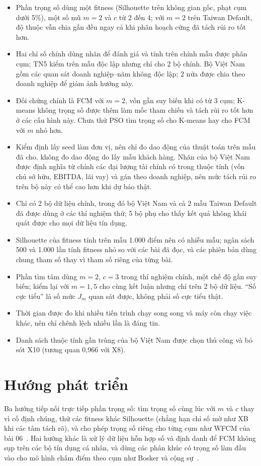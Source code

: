 \begin{itemize}
  \item Phần trọng số dùng một fitness (Silhouette trên không gian gốc, phạt cụm dưới 5\%), một số mũ $m = 2$ và $c$ từ 2 đến
  4; với $m = 2$ trên Taiwan Default, độ thuộc vẫn chia gần đều ngay cả khi phân hoạch cứng đã tách rủi ro tốt hơn.
  \item Hai chỉ số chính dùng nhãn để đánh giá và tính trên chính mẫu được phân cụm; TN5 kiểm trên mẫu độc lập nhưng chỉ cho
  2 bộ chính. Bộ Việt Nam gồm các quan sát doanh nghiệp--năm không độc lập; 2 nửa được chia theo doanh nghiệp để giảm ảnh
  hưởng này.
  \item Đối chứng chính là FCM với $m = 2$, vốn gần suy biến khi có từ 3 cụm; K-means không trọng số được thêm làm mốc tham
  chiếu và tách rủi ro tốt hơn ở các cấu hình này. Chưa thử PSO tìm trọng số cho K-means hay cho FCM với $m$ nhỏ hơn.
  \item Kiểm định lấy seed làm đơn vị, nên chỉ đo dao động của thuật toán trên mẫu đã cho, không đo dao động do lấy mẫu khách
  hàng. Nhãn của bộ Việt Nam được định nghĩa từ chính các đại lượng tài chính có trong thuộc tính (vốn chủ sở hữu, EBITDA, lãi
  vay) và gán theo doanh nghiệp, nên mức tách rủi ro trên bộ này có thể cao hơn khi dự báo thật.
  \item Chỉ có 2 bộ dữ liệu chính, trong đó bộ Việt Nam và cả 2 mẫu Taiwan Default đã được dùng ở các thí nghiệm thử; 5 bộ phụ cho thấy kết quả không khái quát
  được cho mọi dữ liệu tín dụng.
  \item Silhouette của fitness tính trên mẫu 1.000 điểm nên có nhiễu mẫu; ngân sách 500 và 1.000 lần tính fitness nhỏ so với
  các bài đã đọc, và các phiên bản dùng chung tham số thay vì tham số riêng của từng bài.
  \item Phần tìm tâm dùng $m = 2$, $c = 3$ trong thí nghiệm chính, một chế độ gần suy biến; kiểm lại với $m = 1{,}5$ cho cùng
  kết luận nhưng chỉ trên 2 bộ dữ liệu. ``Số cực tiểu'' là số mức $J_m$ quan sát được, không phải số cực tiểu thật.
  \item Thời gian được đo khi nhiều tiến trình chạy song song và máy còn chạy việc khác, nên chỉ chênh lệch nhiều lần là đáng
  tin.
  \item Danh sách thuộc tính gần trùng của bộ Việt Nam được chọn thủ công và bỏ sót X10 (tương quan 0,966 với X8).
\end{itemize}

\section*{Hướng phát triển}

Ba hướng tiếp nối trực tiếp phần trọng số: tìm trọng số cùng lúc với $m$ và $c$ thay vì cố định chúng, thử các fitness khác
Silhouette (chẳng hạn chỉ số mờ như XB khi các tâm tách rõ), và cho phép trọng số riêng cho từng cụm như WFCM của bài
06~\cite{liu2021msgwo}. Hai hướng khác là xử lý dữ liệu hỗn hợp số và định danh để FCM không sụp trên các bộ tín dụng cá nhân,
và dùng các phân khúc có trọng số làm đầu vào cho mô hình chấm điểm theo cụm như Bosker và cộng sự~\cite{bosker2025clustered}.

